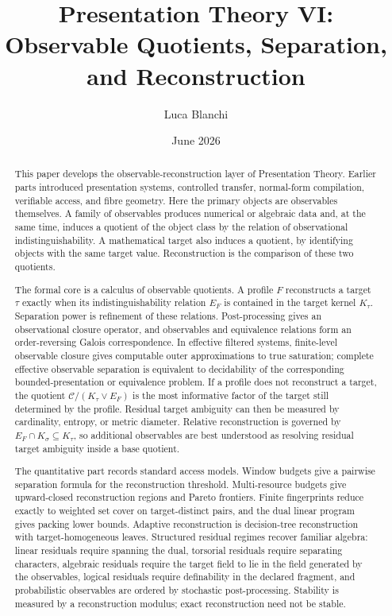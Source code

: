 \documentclass[11pt]{article}
\title{Presentation Theory VI: Observable Quotients, Separation, and Reconstruction}
\author{Luca Blanchi}
\date{June 2026}
\theoremstyle{definition}
\theoremstyle{remark}
\begin{document}
\maketitle

\begin{abstract}
This paper develops the observable-reconstruction layer of Presentation Theory.  Earlier parts introduced presentation systems, controlled transfer, normal-form compilation, verifiable access, and fibre geometry.  Here the primary objects are observables themselves.  A family of observables produces numerical or algebraic data and, at the same time, induces a quotient of the object class by the relation of observational indistinguishability.  A mathematical target also induces a quotient, by identifying objects with the same target value.  Reconstruction is the comparison of these two quotients.

The formal core is a calculus of observable quotients.  A profile \(F\) reconstructs a target \(\tau\) exactly when its indistinguishability relation \(E_F\) is contained in the target kernel \(K_\tau\).  Separation power is refinement of these relations.  Post-processing gives an observational closure operator, and observables and equivalence relations form an order-reversing Galois correspondence.  In effective filtered systems, finite-level observable closure gives computable outer approximations to true saturation; complete effective observable separation is equivalent to decidability of the corresponding bounded-presentation or equivalence problem.  If a profile does not reconstruct a target, the quotient \(\mathcal C/(K_\tau\vee E_F)\) is the most informative factor of the target still determined by the profile.  Residual target ambiguity can then be measured by cardinality, entropy, or metric diameter.  Relative reconstruction is governed by \(E_F\cap K_\sigma\subseteq K_\tau\), so additional observables are best understood as resolving residual target ambiguity inside a base quotient.

The quantitative part records standard access models.  Window budgets give a pairwise separation formula for the reconstruction threshold.  Multi-resource budgets give upward-closed reconstruction regions and Pareto frontiers.  Finite fingerprints reduce exactly to weighted set cover on target-distinct pairs, and the dual linear program gives packing lower bounds.  Adaptive reconstruction is decision-tree reconstruction with target-homogeneous leaves.  Structured residual regimes recover familiar algebra: linear residuals require spanning the dual, torsorial residuals require separating characters, algebraic residuals require the target field to lie in the field generated by the observables, logical residuals require definability in the declared fragment, and probabilistic observables are ordered by stochastic post-processing.  Stability is measured by a reconstruction modulus; exact reconstruction need not be stable.


\end{abstract}
\end{document}
